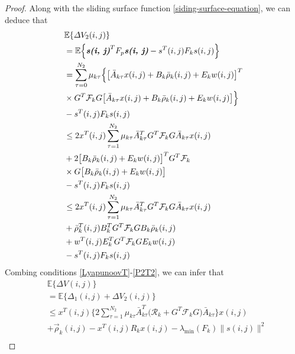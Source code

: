 \documentclass[journal,final,twocolumn]{IEEEtran}
\begin{document}
\begin{proof}
	Along with the sliding surface function \eqref{siding-surface-equation}, we can deduce that
	\begin{equation} \label{P2T2}
		\begin{split}
			&\mathbb{E}\{\varDelta V_{2}(i,j) \}\\
			&=\mathbb{E}\Big\{\emph{\textbf{s(i, j)}}^{T}F_{p}\emph{\textbf{s(i, j)}} - s^{T}(i,j)F_{k}s(i,j)\Big\}\\
			&=  \sum_{\tau =0}^{N_{2}}\mu_{k\tau }\Big\{\big[\bar{A}_{k\tau }x(i,j)+B_{k}\bar{\rho}_{k}(i,j)+E_{k}w(i,j)\big]^{T}\\
			&\times G^{T}\mathcal{F}_{k} G\big[ \bar{A}_{k\tau }x(i,j)+B_{k}\bar{\rho}_{k}(i,j)+E_{k}w(i,j)\big]\Big\}\\
			&-s^{T}(i,j)F_{k}s(i,j)\\
			&\leq 2x^{T}(i,j)\sum_{\tau =1}^{N_{2}}\mu_{k\tau }\bar{A}^{T}_{k\tau }G^{T}\mathcal{F}_{k}G\bar{A}_{k\tau }x(i,j) \\
			&+2\big[B_{k}\bar{\rho}_{k}(i,j)+E_{k}w(i,j)\big]^{T}G^{T}\mathcal{F}_{k}\\
			&\times G\big[B_{k}\bar{\rho}_{k}(i,j)+E_{k}w(i,j)\big]\\
			&-s^{T}(i,j)F_{k}s(i,j)\\
			&\leq 2x^{T}(i,j)\sum_{\tau =1}^{N_{2}}\mu_{k\tau }\bar{A}^{T}_{k\tau }G^{T}\mathcal{F}_{k}G\bar{A}_{k\tau }x(i,j) \\
			&+ \bar{\rho}^{T}_{k}(i,j)B^{T}_{k}G^{T}\mathcal{F}_{k}GB_{k}\bar{\rho}_{k}(i,j)\\
			&+w^{T}(i,j)E^{T}_{k}G^{T}\mathcal{F}_{k}GE_{k}w(i,j)\\
			&-s^{T}(i,j)F_{k}s(i,j)
		\end{split}
	\end{equation}
	Combing conditions \eqref{LyapunoovT}-\eqref{P2T2}, we can infer that 
	\begin{equation}\label{P2T3}
		\begin{split}
				&\mathbb{E}\{\varDelta V(i,j) \}\\
				&= \mathbb{E}\Big\{\varDelta_{1}(i,j)+\varDelta V_{2}(i,j) \Big\}\\
				&\leq x^{T}(i,j)\Big\{ 2\sum_{\tau =1}^{N_{2}}\mu_{k\tau }\bar{A}^{T}_{k\tau }\big(\mathcal{R}_{k} +G^{T}\mathcal{F}_{k}G\big)\bar{A}_{k\tau } \Big\} x(i,j) \\
				& +\vec{\rho}_{k}(i,j)-x^{T}(i,j)R_{k}x(i,j) - \lambda_{\mathrm{min}}(F_{k})\|s(i,j)\|^{2}\\
		\end{split}
	\end{equation}

\end{proof}
\end{document}

